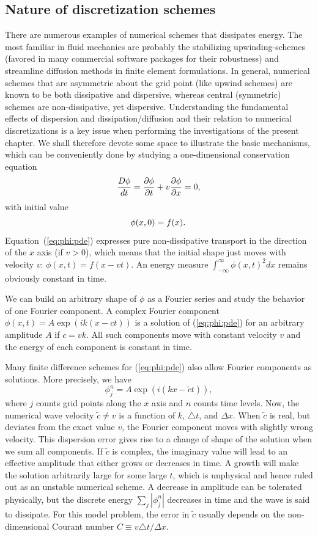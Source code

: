\subsection{Nature of discretization schemes}
\label{sec:dissipative:dispersive}

There are numerous examples of numerical schemes that dissipates
energy. The most familiar in fluid mechanics are probably the
stabilizing upwinding-schemes (favored in many commercial software
packages for their robustness) and streamline diffusion methods in finite
element formulations. In general, numerical schemes that are asymmetric
about the grid point (like upwind schemes) are known to be both
dissipative and dispersive, whereas central (symmetric) schemes are
non-dissipative, yet dispersive. Understanding the fundamental effects
of dispersion and dissipation/diffusion and their relation to numerical
discretizations is a key issue when performing the investigations of
the present chapter. We shall therefore devote some space to illustrate
the basic mechanisms, which can be conveniently done by studying
a one-dimensional conservation equation
\begin{equation}
{D\phi\over dt} = {\partial\phi\over\partial t} + v{\partial\phi\over\partial x}
=0,
\label{eq:phi:pde}
\end{equation}
with initial value 
\[ \phi(x,0)=f(x) . \thinspace\]
Equation~(\ref{eq:phi:pde}) expresses pure non-dissipative transport
in the direction of the $x$ axis (if $v>0$), which means that the initial
shape just moves with velocity $v$: $\phi(x,t) = f(x-vt)$.
An energy measure $\int_{-\infty}^\infty\phi(x,t)^2dx$ remains obviously
constant in time.

We can build an arbitrary shape of $\phi$ as a Fourier
series and study the behavior of one Fourier component. 
A complex Fourier component
$\phi (x,t)=A\exp{(ik(x - ct))}$ is a solution of (\ref{eq:phi:pde})
for an arbitrary amplitude $A$ if $c = vk$. 
All such components move
with constant velocity $v$ and the energy of each component is constant
in time.

Many finite difference schemes for (\ref{eq:phi:pde}) also allow
Fourier components as solutions. More precisely, we have 
\[ \phi_j^n = A\exp{(i(kx - \tilde c t))},\]
where $j$ counts grid points along the $x$ axis and $n$ counts time levels.
Now, the numerical wave velocity $\tilde c \neq v$ is a function of 
$k$, $\triangle t$, and $\Delta x$.
When $\tilde c$ is real,
but deviates from the exact value $v$, the Fourier component moves
with slightly wrong velocity. This dispersion error gives rise to a change
of shape of the solution when we sum all components.
If $\tilde c$ is complex, the imaginary value will lead to an effective
amplitude that either grows or decreases in time. A growth will
make the solution arbitrarily large for some large $t$, which is unphysical
and hence ruled out as an unstable numerical scheme.
A decrease in amplitude can be tolerated physically,
but the discrete energy $\sum_j |\phi_j^n|$ decreases in time and the
wave is said to dissipate.
For this model problem,
the error in $\tilde c$ usually depends on the non-dimensional
Courant number $C\equiv v\triangle t/\Delta x$. 

